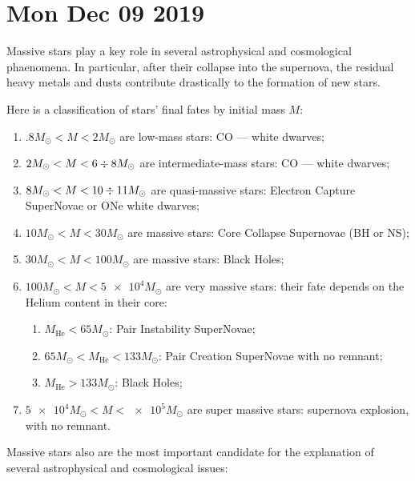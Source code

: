 \documentclass[main.tex]{subfiles}
\begin{document}
\section*{Mon Dec 09 2019}


Massive stars play a key role in several astrophysical and 
cosmological phaenomena.
In particular, after their collapse into the supernova, the residual heavy metals and dusts contribute drastically to the formation of new stars.

Here is a classification of stars' final fates by initial mass \(M\): 
\begin{enumerate}
    \item \(\num{.8} M_{\odot} < M < \num{2} M_{\odot}\) are low-mass stars: CO --- white dwarves;
    \item \(\num{2} M_{\odot} < M < 6 \divisionsymbol 8 M_{\odot}\) are intermediate-mass stars: CO --- white dwarves;
    \item \(\num{8} M_{\odot} < M < 10 \divisionsymbol 11 M_{\odot}\) are quasi-massive stars: Electron Capture SuperNovae or ONe white dwarves;
    \item \(10 M_{\odot} < M < 30 M_{\odot}\) are massive stars: Core Collapse Supernovae (BH or NS);
    \item \(30 M_{\odot} < M < 100 M_{\odot}\) are massive stars: Black Holes;
    \item \(100 M_{\odot} < M < \num{5e4} M_{\odot}\) are very massive stars: their fate depends on the Helium content in their core: \begin{enumerate}
        \item \(M _{\text{He}} < 65 M_{\odot}\): Pair Instability SuperNovae;
        \item \(65 M_{\odot} < M _{\text{He}} < 133 M_{\odot}\): Pair Creation SuperNovae with no remnant;
        \item \(M _{\text{He}} > 133 M_{\odot}\): Black Holes;
    \end{enumerate}
    \item \(\num{5e4} M_{\odot} < M < \num{e5} M_{\odot}\)  are super massive stars: supernova explosion, with no remnant.
\end{enumerate}


Massive stars also are the most important candidate for the explanation of several astrophysical and cosmological issues:
\end{document}
